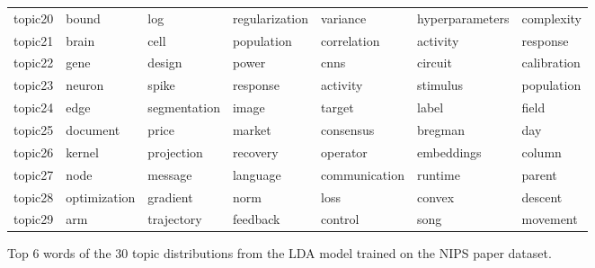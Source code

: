 \documentclass[letterpaper]{article}
\begin{document}
\begin{figure}[H]
\begin{tabular}{l | l l l l l l}
    topic20 & 	bound & 	log & 	regularization & 	variance & 	hyperparameters & 	complexity \\
    topic21 & 	brain & 	cell & 	population & 	correlation & 	activity & 	response \\
    topic22 & 	gene & 	design & 	power & 	cnns & 	circuit & 	calibration \\
    topic23 & 	neuron & 	spike & 	response & 	activity & 	stimulus & 	population \\
    topic24 & 	edge & 	segmentation & 	image & 	target & 	label & 	field \\
    topic25 & 	document & 	price & 	market & 	consensus & 	bregman & 	day \\
    topic26 & 	kernel & 	projection & 	recovery & 	operator & 	embeddings & 	column \\
    topic27 & 	node & 	message & 	language & 	communication & 	runtime & 	parent \\
    topic28 & 	optimization & 	gradient & 	norm & 	loss & 	convex & 	descent \\
    topic29 & 	arm & 	trajectory & 	feedback & 	control & 	song & 	movement \\
  \end{tabular}
  \caption{\label{fig:lda_results} Top 6 words of the 30 topic distributions from the LDA model trained on the NIPS paper dataset.}
\end{figure}
\end{document}

